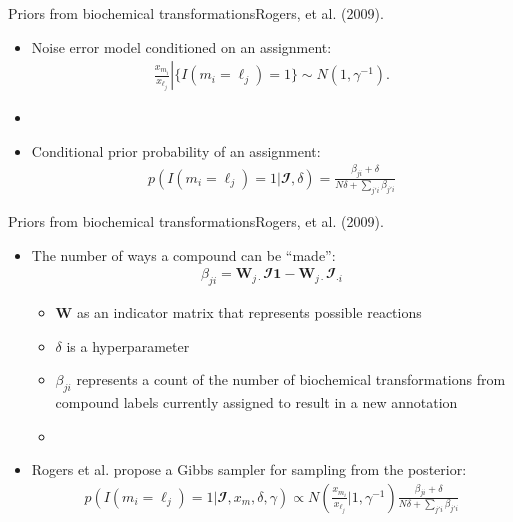 \documentclass[xcolor=dvipsnames]{beamer}
\begin{document}
\begin{frame}{Priors from biochemical transformations}{Rogers, et al. (2009).}
	\vspace{-12pt}
	\begin{itemize}
		\item Noise error model conditioned on an assignment:
		\begin{align*}
		\left. \frac{x_{m_i}}{x_{\ell_j}} \right| \{ I(m_i=\ell_j )=1 \} \sim N\left(1, \gamma^{-1}\right).
		\end{align*}
		\item[]
		\item Conditional prior probability of an assignment:
		\begin{align*}
		p( I(m_i=\ell_j )=1|\mathbfcal{I},\delta) =  \frac{\beta_{ji}+\delta}{N\delta+\sum_{j'i} \beta_{j'i}}
		\end{align*}
	\end{itemize}
\end{frame}

\begin{frame}{Priors from biochemical transformations}{Rogers, et al. (2009).}
	\vspace{-12pt}
	\begin{itemize}
		\item The number of ways a compound can be ``made'':
		\begin{align*}
		\beta_{ji}=\textbf{W}_{j \cdot} \mathbfcal{I} \textbf{1} - \textbf{W}_{j \cdot} \mathbfcal{I}_{\cdot i} 
		\end{align*}
		\begin{itemize}
					\item $\textbf{W}$ as an indicator matrix that represents possible reactions
					\item $\delta$ is a hyperparameter
					\item $\beta_{ji}$ represents a count of the number of biochemical transformations from compound labels currently assigned to result in a new annotation
					\item[]
		\end{itemize}
		\item Rogers et al. propose a Gibbs sampler for sampling from the posterior:
			\begin{align*}
				p( I(m_i=\ell_j )=1|\mathbfcal{I},x_m,\delta,\gamma) \propto N \left( \frac{x_{m_i}}{x_{\ell_j}} | 1,\gamma^{-1} \right) \frac{\beta_{ji}+\delta}{N\delta+\sum_{j'i} \beta_{j'i}}
			\end{align*}
	\end{itemize}
\end{frame}
\end{document}
